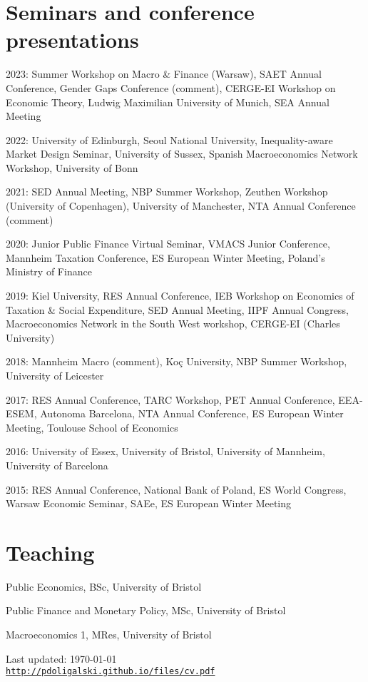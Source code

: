 \documentclass[letterpaper]{article}
\def\footerlink{http://pdoligalski.github.io/files/cv.pdf}
\renewenvironment{itemize}{
  \begin{list}{}{
    \setlength{\leftmargin}{1.5em}
  }
}{
  \end{list}
}
\begin{document}
\section*{Seminars and conference presentations}
\begin{itemize}
  \item 2023: Summer Workshop on Macro \& Finance (Warsaw), SAET Annual Conference, Gender Gaps Conference (comment), CERGE-EI Workshop on Economic Theory, Ludwig Maximilian University of Munich, SEA Annual Meeting
  \item 2022: University of Edinburgh, Seoul National University, Inequality-aware Market Design Seminar, University of Sussex, Spanish Macroeconomics Network Workshop, University of Bonn
  \item 2021: SED Annual Meeting, NBP Summer Workshop, Zeuthen Workshop (University of Copenhagen), University of Manchester, NTA Annual Conference (comment) 
  \item 2020: Junior Public Finance Virtual Seminar, VMACS Junior Conference, Mannheim Taxation Conference, ES European Winter Meeting, Poland's Ministry of Finance
  \item 2019: Kiel University, RES Annual Conference, IEB Workshop on Economics of Taxation \& Social Expenditure, SED Annual Meeting, IIPF Annual Congress, Macroeconomics Network in the South West workshop, CERGE-EI (Charles University)
  \item 2018: Mannheim Macro (comment), Ko\c{c} University, NBP Summer Workshop, University of Leicester
  \item 2017: RES Annual Conference, TARC Workshop, PET Annual Conference, EEA-ESEM, Autonoma Barcelona, NTA Annual Conference, ES European Winter Meeting, Toulouse School of Economics
  \item 2016: University of Essex, University of Bristol, University of Mannheim, University of Barcelona
  \item 2015: RES Annual Conference, National Bank of Poland, ES World Congress, Warsaw Economic Seminar, SAEe, ES European Winter Meeting
\end{itemize}

\section*{Teaching}
\begin{itemize}
  \item Public Economics, BSc, University of Bristol
  \item Public Finance and Monetary Policy, MSc, University of Bristol
  \item Macroeconomics 1, MRes, University of Bristol
\end{itemize}

\bigskip

\begin{center}
  \begin{footnotesize}
    Last updated: \today \\
    \href{\footerlink}{\texttt{\footerlink}}
  \end{footnotesize}
\end{center}
\end{document}
